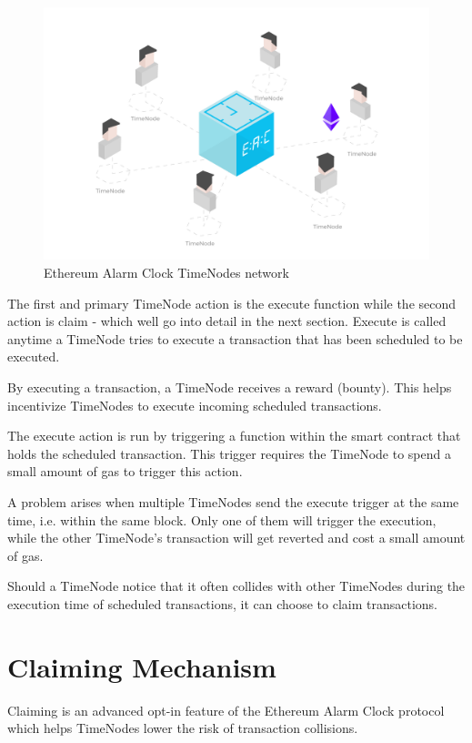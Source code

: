 \documentclass{report}
\begin{document}
  \begin{figure}[h]
    \includegraphics[width=\textwidth]{diagram1}
    \caption{Ethereum Alarm Clock TimeNodes network}
  \end{figure}

  The first and primary TimeNode action is the execute function while the second action is claim - which well go into detail in the next section. Execute is called anytime a TimeNode tries to execute a transaction that has been scheduled to be executed.

  By executing a transaction, a TimeNode receives a reward (bounty). This helps incentivize TimeNodes to execute incoming scheduled transactions.

  The execute action is run by triggering a function within the smart contract that holds the scheduled transaction. This trigger requires the TimeNode to spend a small amount of gas to trigger this action.

  A problem arises when multiple TimeNodes send the execute trigger at the same time, i.e. within the same block. Only one of them will trigger the execution, while the other TimeNode’s transaction will get reverted and cost a small amount of gas.

  Should a TimeNode notice that it often collides with other TimeNodes during the execution time of scheduled transactions, it can choose to claim transactions.

  \section{Claiming Mechanism}
  Claiming is an advanced opt-in feature of the Ethereum Alarm Clock protocol which helps TimeNodes lower the risk of transaction collisions.
\end{document}
